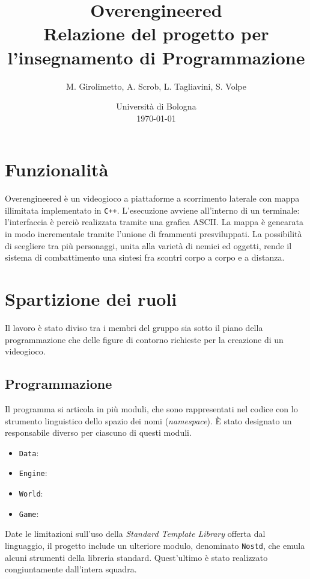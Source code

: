 \documentclass[a4paper]{article}
\title{Overengineered \\
\large Relazione del progetto per l'insegnamento di Programmazione}
\author{
  M. Girolimetto,
  A. Scrob,
  L. Tagliavini,
  S. Volpe
}
\date{
	Universit\`a di Bologna \\
  \today
}
\begin{document}
\maketitle

\section{Funzionalit\`a}

Overengineered \`e un videogioco a piattaforme a scorrimento laterale con mappa
illimitata implementato in \verb!C++!. L'esecuzione avviene all'interno di un terminale:
l'interfaccia \`e perci\`o realizzata tramite una grafica ASCII. La mappa \`e
genearata in modo incrementale tramite l'unione di frammenti presviluppati. La
possibilit\`a di scegliere tra pi\`u personaggi, unita alla variet\`a di nemici
ed oggetti, rende il sistema di combattimento una sintesi fra scontri corpo a
corpo e a distanza.

\section{Spartizione dei ruoli}

Il lavoro \`e stato diviso tra i membri del gruppo sia sotto il piano della
programmazione che delle figure di contorno richieste per la creazione di un videogioco.

\subsection{Programmazione}

Il programma si articola in pi\`u moduli, che sono rappresentati nel codice con
lo strumento linguistico dello spazio dei nomi (\emph{namespace}). \`E stato
designato un responsabile diverso per ciascuno di questi moduli.
\begin{itemize}
  \item \verb!Data!:
  \item \verb!Engine!:
  \item \verb!World!:
  \item \verb!Game!:
\end{itemize}

Date le limitazioni sull'uso della \emph{Standard Template Library} offerta dal
linguaggio, il progetto include un ulteriore modulo, denominato \verb!Nostd!, che emula
alcuni strumenti della libreria standard. Quest'ultimo \`e stato realizzato
congiuntamente dall'intera squadra.
\end{document}
